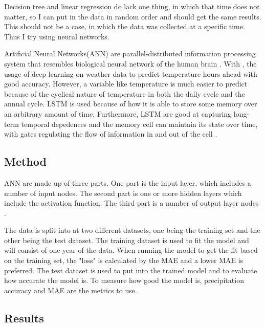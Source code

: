 \documentclass[11pt]{report}
\begin{document}
Decision tree and linear regression do lack one thing, in which that time does not matter, so I can put in the data in random order and should get the same results. This should not be a case, in which the data was collected at a specific time. Thus I try using neural networks.

Artificial Neural Networks(ANN) are parallel-distributed information processing system that resembles biological neural network of the human brain \cite[]{ANN}.
With \cite{Norway}, the usage of deep learning on weather data to 
predict temperature hours ahead with good accuracy. However, a variable like temperature is much easier to predict because of the cyclical nature of temperature in both the daily cycle and the annual cycle. LSTM is used because of how it is able to store some memory over an arbitrary amount of time\cite[]{LSTM}. Furthermore, LSTM are good at capturing long-term temporal depedences and the memory cell can maintain its state over time, with gates regulating the flow of information in and out of the cell \cite[]{LSTM_a}. 
  
\subsection{Method}
ANN are made up of three parts. One part is the input layer, which includes a number of input nodes. The second part is one or more hidden layers which include the activation function. The third part is a number of output layer nodes \cite[]{ART}. 


The data is split into at two different datasets, one being the training set and the other being the test dataset. The training dataset is used to fit the model and will consist of one year of the data. When running the model to get the fit based on the training set, the "loss" is calculated by the MAE and a lower MAE is preferred. The test dataset is used to put into the trained model and to evaluate how accurate the model is. To measure how good the model is, precipitation accuracy and MAE are the metrics to use.  


\clearpage

\subsection{Results}
\end{document}
